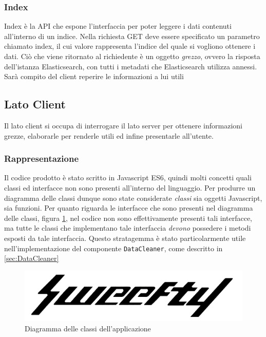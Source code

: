 \subsubsection{Index}
Index è la API che espone l'interfaccia per poter leggere i dati contenuti all'interno di un indice. Nella richiesta GET deve essere specificato un parametro chiamato index, il cui valore rappresenta l'indice del quale si vogliono ottenere i dati. Ciò che viene ritornato al richiedente è un oggetto \emph{grezzo}, ovvero la risposta dell'istanza Elasticsearch, con tutti i metadati che Elasticsearch utilizza annessi. Sarà compito del client reperire le informazioni a lui utili

\subsection{Lato Client}
Il lato client si occupa di interrogare il lato server per ottenere informazioni grezze, elaborarle per renderle utili ed infine presentarle all'utente.

\label{sec:Componenti}
\subsubsection{Rappresentazione}
Il codice prodotto è stato scritto in Javascript ES6, quindi molti concetti quali classi ed interfacce non sono presenti all'interno del linguaggio. Per produrre un diagramma delle classi dunque sono state considerate \emph{ classi } sia oggetti Javascript, sia funzioni. Per quanto riguarda le interfacce che sono presenti nel diagramma delle classi, figura \ref{img:diagrammaClassiClient}, nel codice non sono effettivamente presenti tali interfacce, ma tutte le classi che implementano tale interfaccia \emph{devono} possedere i metodi esposti da tale interfaccia. Questo stratagemma è stato particolarmente utile nell'implementazione del componente \texttt{DataCleaner}, come descritto in \ref{sec:DataCleaner}

\begin{figure}[H]
    \centering
    \includegraphics[width=1\textwidth]{Images/logo.jpg}
    \caption{Diagramma delle classi dell'applicazione}
    \label{img:diagrammaClassiClient}
\end{figure}

